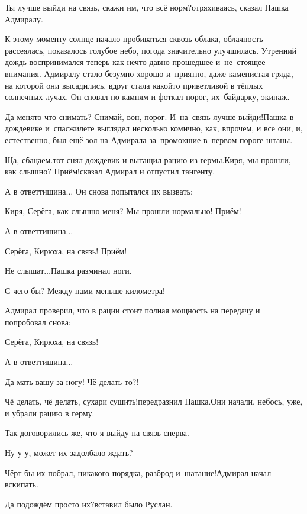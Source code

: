 \diagdash Ты лучше выйди на связь, скажи им, что всё норм?\mdash отряхиваясь, сказал Пашка Адмиралу.

К этому моменту солнце начало пробиваться сквозь облака, облачность рассеялась, показалось голубое небо, погода значительно улучшилась. Утренний дождь воспринимался теперь как нечто давно прошедшее и~не~стоящее внимания. Адмиралу стало безумно хорошо и~приятно, даже каменистая гряда, на которой они высадились, вдруг стала какой\sdash то приветливой в тёплых солнечных лучах. Он сновал по камням и фоткал порог, их~байдарку, экипаж.

\diagdash Да меня\sdash то что снимать? Снимай, вон, порог. И~на~связь лучше выйди!\mdash Пашка в дождевике и~спасжилете выглядел несколько комично, как, впрочем, и все они, и, естественно, был ещё зол на Адмирала за~промокшие в~первом пороге штаны. 

\diagdash Ща, сбацаем.\mdash тот снял дождевик и вытащил рацию из гермы.\mdash Киря, мы прошли, как слышно? Приём!\mdash сказал Адмирал и отпустил тангенту.

А в ответ\mdash тишина$\ldots$ Он снова попытался их вызвать:

\diagdash Киря, Серёга, как слышно меня? Мы прошли нормально! Приём!

А в ответ\mdash тишина$\ldots$

\diagdash Серёга, Кирюха, на связь! Приём!

\diagdash Не слышат$\ldots$\mdash Пашка разминал ноги.

\diagdash С чего бы? Между нами меньше километра!

Адмирал проверил, что в рации стоит полная мощность на передачу и попробовал снова:

\diagdash Серёга, Кирюха, на связь!

А в ответ\mdash тишина$\ldots$

\diagdash Да мать вашу за ногу! Чё делать то?!

\diagdash Чё делать, чё делать, сухари сушить!\mdash передразнил Пашка.\mdash Они начали, небось, уже, и убрали рацию в герму.

\diagdash Так договорились же, что я выйду на связь сперва.

\diagdash Ну-у-у, может их задолбало ждать?

\diagdash Чёрт бы их побрал, никакого порядка, разброд и~шатание!\mdash Адмирал начал вскипать.

\diagdash Да подождём просто их?\mdash вставил было Руслан.

